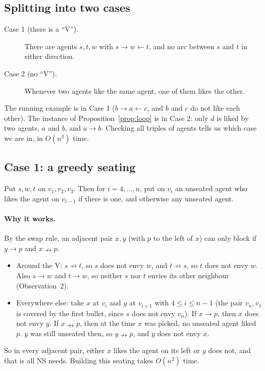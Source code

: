 \documentclass[11pt,a4paper]{article}
\theoremstyle{definition}
\theoremstyle{remark}
\theoremstyle{plain}
\newcommand{\nlikes}{\nrightarrow}
\begin{document}
\subsection{Splitting into two cases}

\begin{description}
  \item[Case 1 (there is a ``V'').] There are agents $s,t,w$ with $s\to w\leftarrow t$, and no arc between $s$ and $t$ in either direction.
  \item[Case 2 (no ``V'').] Whenever two agents like the same agent, one of them likes the other.
\end{description}
The running example is in Case 1 ($b\to a\leftarrow c$, and $b$ and $c$ do not like each other). The instance of Proposition~\ref{prop:loop} is in Case 2: only $d$ is liked by two agents, $a$ and $b$, and $a\to b$. Checking all triples of agents tells us which case we are in, in $O(n^3)$ time.

\subsection{Case 1: a greedy seating}

Put $s,w,t$ on $v_1,v_2,v_3$. Then for $i=4,\dots,n$, put on $v_i$ an unseated agent who likes the agent on $v_{i-1}$ if there is one, and otherwise any unseated agent.

\paragraph{Why it works.} By the swap rule, an adjacent pair $x,y$ (with $p$ to the left of $x$) can only block if $y\to p$ and $x\nlikes p$.
\begin{itemize}
  \item Around the V: $s\nlikes t$, so $s$ does not envy $w$, and $t\nlikes s$, so $t$ does not envy $w$. Also $s\to w$ and $t\to w$, so neither $s$ nor $t$ envies its other neighbour (Observation~2).
  \item Everywhere else: take $x$ at $v_i$ and $y$ at $v_{i+1}$ with $4\le i\le n-1$ (the pair $v_n,v_1$ is covered by the first bullet, since $s$ does not envy $v_n$). If $x\to p$, then $x$ does not envy $y$. If $x\nlikes p$, then at the time $x$ was picked, no unseated agent liked $p$. $y$ was still unseated then, so $y\nlikes p$, and $y$ does not envy $x$.
\end{itemize}
So in every adjacent pair, either $x$ likes the agent on its left or $y$ does not, and that is all NS needs. Building this seating takes $O(n^2)$ time.
\end{document}
